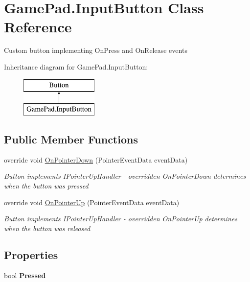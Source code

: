 \hypertarget{class_game_pad_1_1_input_button}{}\section{Game\+Pad.\+Input\+Button Class Reference}
\label{class_game_pad_1_1_input_button}


Custom button implementing On\+Press and On\+Release events  


Inheritance diagram for Game\+Pad.\+Input\+Button\+:\begin{figure}[H]
\begin{center}
\leavevmode
\includegraphics[height=2.000000cm]{class_game_pad_1_1_input_button}
\end{center}
\end{figure}
\subsection*{Public Member Functions}
\begin{DoxyCompactItemize}
\item 
override void \mbox{\hyperlink{class_game_pad_1_1_input_button_ae2eceb95e7bef0d55a7cc59b37a86d31}{On\+Pointer\+Down}} (Pointer\+Event\+Data event\+Data)
\begin{DoxyCompactList}\small\item\em Button implements I\+Pointer\+Up\+Handler -\/ overridden On\+Pointer\+Down determines when the button was pressed \end{DoxyCompactList}\item 
override void \mbox{\hyperlink{class_game_pad_1_1_input_button_a8749d8fe6ceacc630d3f85f6feab279b}{On\+Pointer\+Up}} (Pointer\+Event\+Data event\+Data)
\begin{DoxyCompactList}\small\item\em Button implements I\+Pointer\+Up\+Handler -\/ overridden On\+Pointer\+Up determines when the button was released \end{DoxyCompactList}\end{DoxyCompactItemize}
\subsection*{Properties}
\begin{DoxyCompactItemize}
\item 
\mbox{\label{class_game_pad_1_1_input_button_afc288e463a40618d1bf90e57e5f2b00c}} 
bool {\bfseries Pressed}
\end{DoxyCompactItemize}


